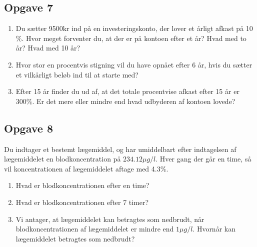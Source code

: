 \subsection*{Opgave 7}
\begin{enumerate}[label=\roman*)]
	\item Du sætter 9500kr ind på en investeringskonto, der lover et årligt afkast på 10$\%$. Hvor meget forventer du,
	 at der er på kontoen efter et år? Hvad med to år? Hvad med 10 år?
	\item Hvor stor en procentvis stigning vil du have opnået efter 6 år, hvis du sætter et vilkårligt beløb ind til at
	starte med?
	\item Efter 15 år finder du ud af, at det totale procentvise afkast efter 15 år er $300\%$. Er det mere eller mindre 
	end hvad udbyderen af kontoen lovede?
\end{enumerate}

\subsection*{Opgave 8}
Du indtager et bestemt lægemiddel, og har umiddelbart efter indtagelsen af lægemiddelet en blodkoncentration 
	på $234.12 \mu g / l$. Hver gang der går en time, så vil koncentrationen af lægemiddelet aftage med 4.3$\%$. 
\begin{enumerate}[label=\roman*)]
	\item Hvad er blodkoncentrationen efter en time? 
	\item Hvad er blodkoncentrationen efter 7 timer?
	\item Vi antager, at lægemiddelet kan betragtes som nedbrudt, når blodkoncentrationen af lægemiddelet er mindre end
	 $1\mu g/l$. Hvornår kan lægemiddelet betragtes som nedbrudt?
\end{enumerate}